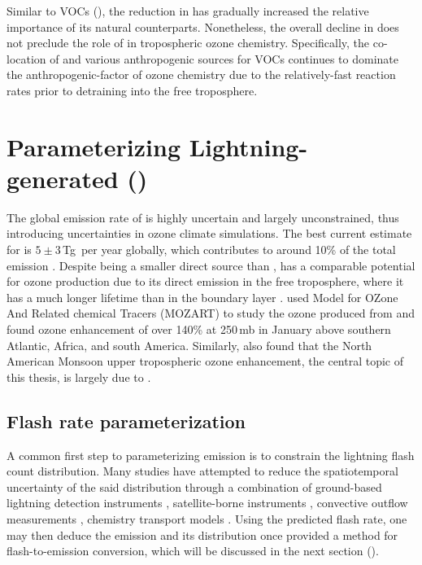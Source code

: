 	Similar to VOCs (), the reduction in {\anox} has gradually increased the relative importance of its natural counterparts. Nonetheless, the overall decline in {\anox} does not preclude the role of {\anox} in tropospheric ozone chemistry. Specifically, the co-location of {\anox} and various anthropogenic sources for VOCs continues to dominate the anthropogenic-factor of ozone chemistry due to the relatively-fast reaction rates prior to detraining into the free troposphere.


%
%

\section{Parameterizing Lightning-generated  ({\lnox})} \label{sec:intro/lightning}

The global emission rate of {\lnox} is highly uncertain and largely unconstrained, thus introducing uncertainties in ozone climate simulations. The best current estimate for {\lnox} is $5\pm3$\,\unit{Tg}\, per year globally, which contributes to around 10\% of the total  emission \citep{Schumann:2007fk}. Despite being a smaller direct source than {\anox}, {\lnox} has a comparable potential for ozone production due to its direct emission in the free troposphere, where it has a much longer lifetime than in the boundary layer \citep{Lamarque:1996kx,Allen:2000uq}. \citet{Hauglustaine:2001mi} used Model for OZone And Related chemical Tracers (MOZART) to study the ozone produced from {\lnox} and found ozone enhancement of over 140\% at 250\,\unit{mb} in January above southern Atlantic, Africa, and south America. Similarly, \citet{Cooper:2007cr} also found that the North American Monsoon upper tropospheric ozone enhancement, the central topic of this thesis, is largely due to {\lnox}.

\subsection{Flash rate parameterization}\label{ssec:intro/lightning/flash}

	A common first step to parameterizing {\lnox} emission is to constrain the lightning flash count distribution. Many studies have attempted to reduce the spatiotemporal uncertainty of the said distribution through a combination of ground-based lightning detection instruments \citep[e.g.][]{Boccippio:2001ys,Hansen:2010fk}, satellite-borne instruments \citep[e.g.][]{Ushio:2001kx,Jourdain:2010tw,Martini:2011fk}, convective outflow measurements \citep[e.g.][]{Pickering:1998sh,Skamarock:2003mq}, chemistry transport models \citep[e.g.][]{Price:1997fk,Allen:2010fk,Allen:2012fk,Ott:2010lo}. Using the predicted flash rate, one may then deduce the {\lnox} emission and its distribution once provided a method for flash-to-emission conversion, which will be discussed in the next section ().

